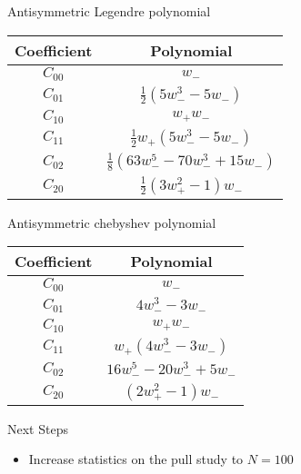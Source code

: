 

\begin{frame}{Antisymmetric Legendre polynomial}
\begin{center}
\begin{tabular}{|c|c|}
Coefficient & Polynomial \\ \hline

$C_{00}$ & $w_-$ \\
$C_{01}$ & $\frac{1}{2} \left(5 w_-^3 - 5 w_-\right)$ \\
$C_{10}$ & $ w_+ w_-$ \\
$C_{11}$ & $ \frac{1}{2} w_+  \left(5 w_-^3 - 5 w_-\right)$\\
$C_{02}$ & $\frac{1}{8}\left(63 w_-^5 - 70 w_-^3 + 15 w_-\right)$ \\
$C_{20}$ & $\frac{1}{2} \left(3 w_+^2 - 1\right) w_-$

\end{tabular}
\end{center}
\end{frame}


\begin{frame}{Antisymmetric chebyshev polynomial}
\begin{center}
\begin{tabular}{|c|c|}
Coefficient & Polynomial \\ \hline

$C_{00}$ & $w_-$ \\
$C_{01}$ & $4 w_-^3 - 3 w_-$ \\
$C_{10}$ & $ w_+ w_-$ \\
$C_{11}$ & $ w_+ \left(4 w_-^3 - 3 w_-\right)$\\
$C_{02}$ & $16 w_-^5 - 20 w_-^3 + 5 w_-$ \\
$C_{20}$ & $\left(2 w_+^2 - 1\right) w_-$

\end{tabular}
\end{center}
\end{frame}


\begin{frame}{Next Steps}
\begin{itemize}
\item Increase statistics on the pull study to $N=100$
\end{itemize}
\end{frame}


